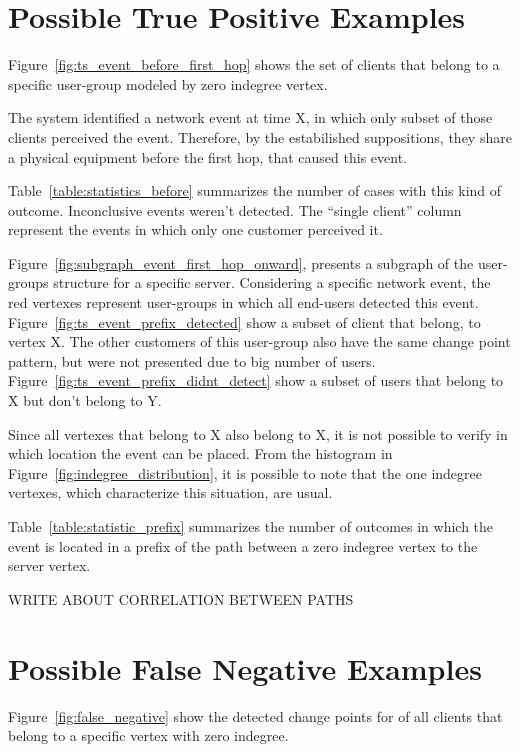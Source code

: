 \section{Possible True Positive Examples}
\label{sec:possible_true_positive_examples}

Figure~\ref{fig:ts_event_before_first_hop} shows the set of clients that belong
to a specific user-group modeled by zero indegree vertex.

The system identified a network event at time X, in which only subset of those
clients perceived the event. Therefore, by the estabilished suppositions, they
share a physical equipment before the first hop, that caused this event.

Table~\ref{table:statistics_before} summarizes the number of cases with
this kind of outcome. Inconclusive events weren't detected. The ``single
client''
column represent the events in which only one customer perceived it.

Figure~\ref{fig:subgraph_event_first_hop_onward}, presents a subgraph of the
user-groups structure for a specific server. Considering a specific network
event, the red vertexes represent user-groups in which all end-users detected
this event. Figure~\ref{fig:ts_event_prefix_detected} show a subset of client
that
belong, to vertex X. The other customers of this user-group also have the same
change point pattern, but were not presented due to big number of users.
Figure~\ref{fig:ts_event_prefix_didnt_detect} show a subset of users that
belong to X but don't belong to Y.

Since all vertexes that belong to X also belong to X, it is not possible to
verify in which location the event can be placed. From the histogram in
Figure~\ref{fig:indegree_distribution}, it is possible to note that the one
indegree vertexes, which characterize this situation, are usual.

Table~\ref{table:statistic_prefix} summarizes the number of outcomes in which
the event is located in a prefix of the path between a zero indegree vertex to
the server vertex.

WRITE ABOUT CORRELATION BETWEEN PATHS

\section{Possible False Negative Examples}
\label{sec:possible_false_negative_examples}

Figure~\ref{fig:false_negative} show the detected change points for of all
clients that belong to a specific vertex with zero indegree.


